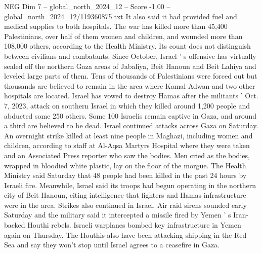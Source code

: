 \begin{textsample}{NEG Dim 7 – global\_north\_2024\_12 – Score -1.00 – global\_north\_2024\_12/119360875.txt}
It also said it had provided fuel and medical supplies to both hospitals.
The war has killed more than 45,400 Palestinians, over half of them women and children, and wounded more than 108,000 others, according to the Health Ministry.
Its count does not distinguish between civilians and combatants.
Since October, Israel ' s offensive has virtually sealed off the northern Gaza areas of Jabaliya, Beit Hanoun and Beit Lahiya and leveled large parts of them.
Tens of thousands of Palestinians were forced out but thousands are believed to remain in the area where Kamal Adwan and two other hospitals are located.
Israel has vowed to destroy Hamas after the militants ' Oct. 7, 2023, attack on southern Israel in which they killed around 1,200 people and abducted some 250 others.
Some 100 Israelis remain captive in Gaza, and around a third are believed to be dead.
Israel continued attacks across Gaza on Saturday.
An overnight strike killed at least nine people in Maghazi, including women and children, according to staff at Al-Aqsa Martyrs Hospital where they were taken and an Associated Press reporter who saw the bodies.
Men cried as the bodies, wrapped in bloodied white plastic, lay on the floor of the morgue.
The Health Ministry said Saturday that 48 people had been killed in the past 24 hours by Israeli fire.
Meanwhile, Israel said its troops had begun operating in the northern city of Beit Hanoun, citing intelligence that fighters and Hamas infrastructure were in the area.
Strikes also continued in Israel.
Air raid sirens sounded early Saturday and the military said it intercepted a missile fired by Yemen ' s Iran-backed Houthi rebels.
Israeli warplanes bombed key infrastructure in Yemen again on Thursday.
The Houthis also have been attacking shipping in the Red Sea and say they won't stop until Israel agrees to a ceasefire in Gaza.

\end{textsample}
